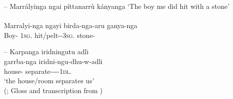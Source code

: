 \documentclass{langscibook}
\begin{document}
\begin{xlist}
\begin{xlist}
\begin{xlist}
--
\ea\label{ex:key:48}
Marrályinga ngai píttanarrù kányanga
\glt `The boy me did hit with a stone'\\
\citep[5]{schurmann_vocabulary_1844} \\
\gll Marralyi-nga ngayi birda-nga-aru ganya-nga \\
Boy- 1\textsc{sg}.  hit/pelt--3\textsc{sg}. stone- \\
\z




--
\ea\label{ex:key:49} %
\glll Karpanga   {iridningutu adli} \\
garrba-nga   iridni-ngu-dhu-w-adli \\
house-   separate----1\textsc{dl}.\\
\glt `the house/room separates us' \\
\hfill (\citealt[V:8]{schurmann_vocabulary_1844}; Gloss and transcription from \citet[44]{Clendon2015})
\z





\end{xlist}
\end{xlist}
\end{xlist}
\end{document}
